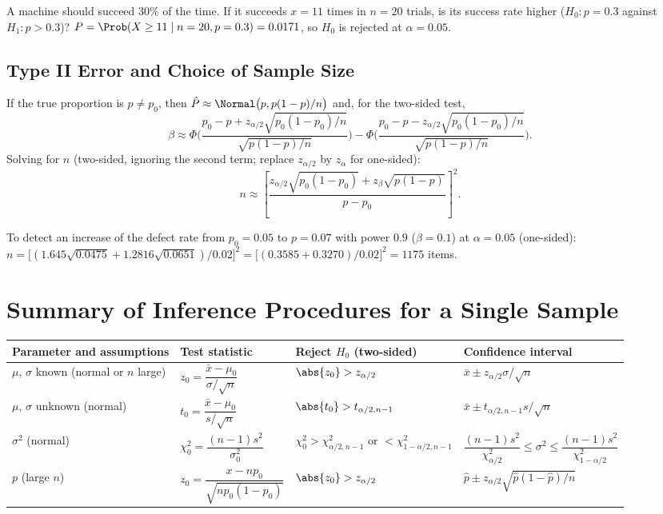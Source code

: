\begin{example}
A machine should succeed $30\%$ of the time. If it succeeds $x=11$ times in $n=20$ trials, is its success rate higher ($H_0:p=0.3$ against $H_1:p>0.3$)? $P=\Prob(X\ge11\mid n=20,p=0.3)=0.0171$, so $H_0$ is rejected at $\alpha=0.05$.
\end{example}

\subsection{Type II Error and Choice of Sample Size}

If the true proportion is $p\ne p_0$, then $\hat{P}\approx\Normal\big(p,p(1-p)/n\big)$ and, for the two-sided test,
\[ \beta\approx\Phi\Big(\frac{p_0-p+z_{\alpha/2}\sqrt{p_0(1-p_0)/n}}{\sqrt{p(1-p)/n}}\Big)-\Phi\Big(\frac{p_0-p-z_{\alpha/2}\sqrt{p_0(1-p_0)/n}}{\sqrt{p(1-p)/n}}\Big). \]
Solving for $n$ (two-sided, ignoring the second term; replace $z_{\alpha/2}$ by $z_\alpha$ for one-sided):
\[ n\approx\left[\frac{z_{\alpha/2}\sqrt{p_0(1-p_0)}+z_\beta\sqrt{p(1-p)}}{p-p_0}\right]^2. \]

\begin{example}
To detect an increase of the defect rate from $p_0=0.05$ to $p=0.07$ with power $0.9$ ($\beta=0.1$) at $\alpha=0.05$ (one-sided): $n=\big[(1.645\sqrt{0.0475}+1.2816\sqrt{0.0651})/0.02\big]^2=\big[(0.3585+0.3270)/0.02\big]^2=1175$ items.
\end{example}

\section{Summary of Inference Procedures for a Single Sample}

\begin{center}
\small
\begin{tabular}{p{2.4cm}p{3.2cm}p{3.6cm}p{3.4cm}}
\toprule
Parameter and assumptions & Test statistic & Reject $H_0$ (two-sided) & Confidence interval \\
\midrule
$\mu$, $\sigma$ known (normal or $n$ large) & $z_0=\dfrac{\bar{x}-\mu_0}{\sigma/\sqrt n}$ & $\abs{z_0}>z_{\alpha/2}$ & $\bar{x}\pm z_{\alpha/2}\sigma/\sqrt n$ \\
$\mu$, $\sigma$ unknown (normal) & $t_0=\dfrac{\bar{x}-\mu_0}{s/\sqrt n}$ & $\abs{t_0}>t_{\alpha/2,n-1}$ & $\bar{x}\pm t_{\alpha/2,n-1}s/\sqrt n$ \\
$\sigma^2$ (normal) & $\chi_0^2=\dfrac{(n-1)s^2}{\sigma_0^2}$ & $\chi_0^2>\chi^2_{\alpha/2,n-1}$ or $<\chi^2_{1-\alpha/2,n-1}$ & $\dfrac{(n-1)s^2}{\chi^2_{\alpha/2}}\le\sigma^2\le\dfrac{(n-1)s^2}{\chi^2_{1-\alpha/2}}$ \\
$p$ (large $n$) & $z_0=\dfrac{x-np_0}{\sqrt{np_0(1-p_0)}}$ & $\abs{z_0}>z_{\alpha/2}$ & $\hat{p}\pm z_{\alpha/2}\sqrt{\hat{p}(1-\hat{p})/n}$ \\
\bottomrule
\end{tabular}
\end{center}

